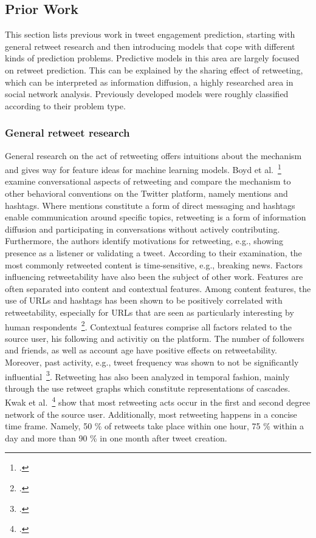 \subsection{Prior Work}
\label{sec:prior_work}

This section lists previous work in tweet engagement prediction, starting with
general retweet research and then introducing models that cope with different
kinds of prediction problems.
Predictive models in this area are largely focused on retweet prediction.
This can be explained by the sharing effect of retweeting, which can be interpreted
as information diffusion, a highly researched area in social network analysis.
Previously developed models were roughly classified according to their problem type.

\subsubsection{General retweet research}

General research on the act of retweeting offers intuitions about the mechanism
and gives way for feature ideas for machine learning models.
Boyd et al.~\footcite{Golder} examine conversational aspects of retweeting and
compare the mechanism to other behavioral conventions on the Twitter platform,
namely mentions and hashtags.
Where mentions constitute a form of direct messaging and hashtags enable
communication around specific topics, retweeting is a form of information
diffusion and participating in conversations without actively contributing.
Furthermore, the authors identify motivations for retweeting, e.g., showing
presence as a listener or validating a tweet.
According to their examination, the most commonly retweeted content is
time-sensitive, e.g., breaking news.
Factors influencing retweetability have also been the subject of other work.
Features are often separated into content and contextual features.
Among content features, the use of URLs and hashtags has been shown to be
positively correlated with retweetability, especially for URLs that are seen
as particularly interesting by human respondents~\footcite{Suh}.
Contextual features comprise all factors related to the source user, his
following and activitiy on the platform.
The number of followers and friends, as well as account age have positive
effects on retweetability.
Moreover, past activity, e.g., tweet frequency was shown to not be significantly
influential~\footcite{Bakshy2011, Suh}.
Retweeting has also been analyzed in temporal fashion, mainly through the use
retweet graphs which constitute representations of cascades.
Kwak et al.~\footcite{Kwak2010} show that most retweeting acts occur in the first
and second degree network of the source user.
Additionally, most retweeting happens in a concise time frame.
Namely, 50 \% of retweets take place within one hour, 75 \% within a day and more
than 90 \% in one month after tweet creation.

